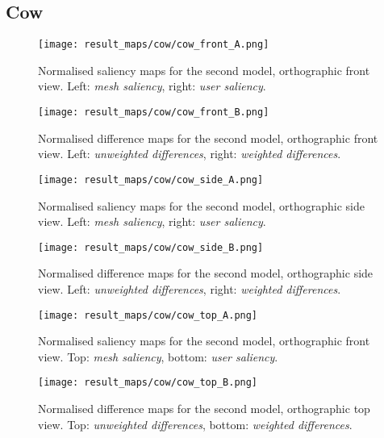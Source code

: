		\subsection{Cow}
		\label{sec:results_cow}
%
%
\begin{figure}[htb]
	\centering
	\texttt{[image: result\_maps/cow/cow\_front\_A.png]}\\ %
	\caption{Normalised saliency maps for the second model, orthographic front view. Left: \textit{mesh saliency}, right: \textit{user saliency}.}
	\label{fig:results_cow_front_a}
\end{figure}
\begin{figure}[htb]
	\centering
	\texttt{[image: result\_maps/cow/cow\_front\_B.png]}\\ %
	\caption{Normalised difference maps for the second model, orthographic front view. Left: \textit{unweighted differences}, right: \textit{weighted differences}.}
	\label{fig:results_cow_front_b}
\end{figure}

\begin{figure}[htb]
	\centering
	\texttt{[image: result\_maps/cow/cow\_side\_A.png]}\\ %
	\caption{Normalised saliency maps for the second model, orthographic side view. Left: \textit{mesh saliency}, right: \textit{user saliency}.}
	\label{fig:results_cow_side_a}
\end{figure}
\begin{figure}[htb]
	\centering
	\texttt{[image: result\_maps/cow/cow\_side\_B.png]}\\ %
	\caption{Normalised difference maps for the second model, orthographic side view. Left: \textit{unweighted differences}, right: \textit{weighted differences}.}
	\label{fig:results_cow_side_b}
\end{figure}

\begin{figure}[htb]
	\centering
	\texttt{[image: result\_maps/cow/cow\_top\_A.png]}\\ %
	\caption{Normalised saliency maps for the second model, orthographic front view. Top: \textit{mesh saliency}, bottom: \textit{user saliency}.}
	\label{fig:results_cow_top_a}
\end{figure}
\begin{figure}[htb]
	\centering
	\texttt{[image: result\_maps/cow/cow\_top\_B.png]}\\ %
	\caption{Normalised difference maps for the second model, orthographic top view. Top: \textit{unweighted differences}, bottom: \textit{weighted differences}.}
	\label{fig:results_cow_top_b}
\end{figure}

